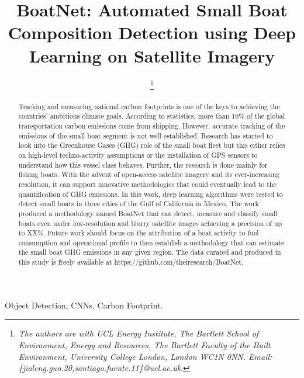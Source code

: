\documentclass[lettersize,journal]{IEEEtran}
\begin{document}
\title{BoatNet: Automated Small Boat Composition Detection using Deep Learning on Satellite Imagery}

\author{

\thanks{\textit{
The authors are with UCL Energy Institute, The Bartlett School of Environment, Energy and Resources, The Bartlett Faculty of the Built Environment, University College London, London WC1N 0NN. Email: \{jialeng.guo.20,santiago.fuente.11\}@ucl.ac.uk}.} 
}



\maketitle

\begin{abstract}
Tracking and measuring national carbon footprints is one of the keys to achieving the countries' ambitious climate goals. According to statistics, more than 10\% of the global transportation carbon emissions come from shipping. However, accurate tracking of the emissions of the small boat segment is not well established. Research has started to look into the Greenhouse Gases (GHG) role of the small boat fleet but this either relies on high-level techno-activity assumptions or the installation of GPS sensors to understand how this vessel class behaves. Further, the research is done mainly for fishing boats. With the advent of open-access satellite imagery and its ever-increasing resolution, it can support innovative methodologies that could eventually lead to the quantification of GHG emissions. In this work, deep learning algorithms were tested to detect small boats in three cities of the Gulf of California in Mexico. The work produced a methodology named BoatNet that can detect, measure and classify small boats even under low-resolution and blurry satellite images achieving a precision of up to XX\%. Future work should focus on the attribution of a boat activity to fuel consumption and operational profile to then establish a methodology that can estimate the small boat GHG emissions in any given region. The data curated and produced in this study is freely available at https://github.com/theiresearch/BoatNet.
\end{abstract}


\begin{IEEEkeywords}
Object Detection, CNNs, Carbon Footprint.
\end{IEEEkeywords}
\end{document}

